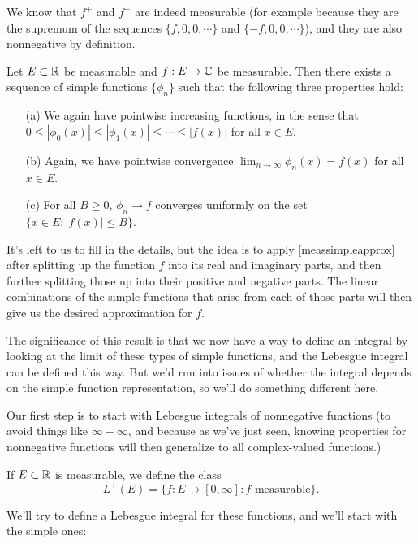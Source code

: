 We know that $f^+$ and $f^-$ are indeed measurable (for example because they are the supremum of the sequences $\{f, 0, 0, \cdots\}$ and $\{-f, 0, 0, \cdots\}$), and they are also nonnegative by definition.

\begin{theorem}
Let $E \subset \mathbb R$ be measurable and $f: E \to \mathbb C$ be measurable. Then there exists a sequence of simple functions $\{\phi_n\}$ such that the following three properties hold:
\begin{itemize}
\item[(a)] We again have pointwise increasing functions, in the sense that $0 \le |\phi_0(x)| \le |\phi_1(x)| \le \cdots \le |f(x)|$ for all $x \in E$.
\item[(b)] Again, we have pointwise convergence $\lim_{n \to \infty} \phi_n(x) = f(x)$ for all $x \in E$.
\item[(c)] For all $B \ge 0$, $\phi_n \to f$ converges uniformly on the set $\{x \in E: |f(x)| \le B\}$.
\end{itemize}
\end{theorem}

It's left to us to fill in the details, but the idea is to apply \cref{meassimpleapprox} after splitting up the function $f$ into its real and imaginary parts, and then further splitting those up into their positive and negative parts. The linear combinations of the simple functions that arise from each of those parts will then give us the desired approximation for $f$. 

The significance of this result is that we now have a way to define an integral by looking at the limit of these types of simple functions, and the Lebesgue integral can be defined this way. But we'd run into issues of whether the integral depends on the simple function representation, so we'll do something different here.

Our first step is to start with Lebesgue integrals of nonnegative functions (to avoid things like $\infty - \infty$, and because as we've just seen, knowing properties for nonnegative functions will then generalize to all complex-valued functions.)

\begin{definition}
If $E \subset \mathbb R$ is measurable, we define the class 
\[
    L^+(E) = \{f: E \to [0, \infty]: f \text{ measurable}\}.
\]
\end{definition}

We'll try to define a Lebesgue integral for these functions, and we'll start with the simple ones: 

